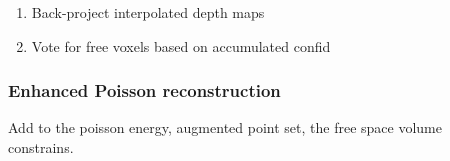 \documentclass{article}
\begin{document}
\begin{enumerate}
	\item Back-project interpolated depth maps
	\item Vote for free voxels based on accumulated confid
\end{enumerate}

\subsubsection*{Enhanced Poisson reconstruction}
Add to the poisson energy, augmented point set, the free space volume constrains. 

\subsection{ \cite{rematas2014image} }





\end{document}
